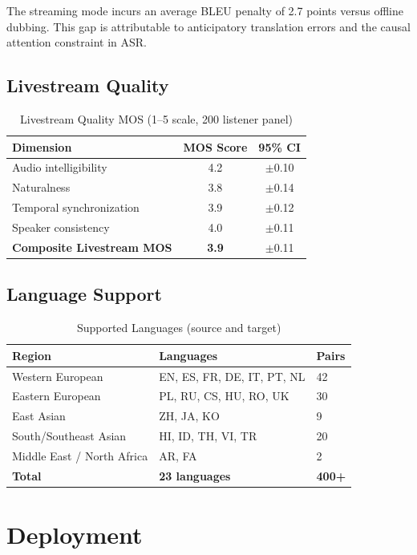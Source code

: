 \documentclass[11pt,a4paper]{article}
\begin{document}
The streaming mode incurs an average BLEU penalty of 2.7 points versus offline dubbing. This gap is attributable to anticipatory translation errors and the causal attention constraint in ASR.

\subsection{Livestream Quality}

\begin{table}[H]
\centering
\caption{Livestream Quality MOS (1--5 scale, 200 listener panel)}
\begin{tabular}{lcc}
\toprule
\textbf{Dimension} & \textbf{MOS Score} & \textbf{95\% CI} \\
\midrule
Audio intelligibility & 4.2 & $\pm$0.10 \\
Naturalness & 3.8 & $\pm$0.14 \\
Temporal synchronization & 3.9 & $\pm$0.12 \\
Speaker consistency & 4.0 & $\pm$0.11 \\
\textbf{Composite Livestream MOS} & \textbf{3.9} & $\pm$0.11 \\
\bottomrule
\end{tabular}
\end{table}

\subsection{Language Support}

\begin{table}[H]
\centering
\caption{Supported Languages (source and target)}
\begin{tabular}{lll}
\toprule
\textbf{Region} & \textbf{Languages} & \textbf{Pairs} \\
\midrule
Western European & EN, ES, FR, DE, IT, PT, NL & 42 \\
Eastern European & PL, RU, CS, HU, RO, UK & 30 \\
East Asian & ZH, JA, KO & 9 \\
South/Southeast Asian & HI, ID, TH, VI, TR & 20 \\
Middle East / North Africa & AR, FA & 2 \\
\midrule
\textbf{Total} & \textbf{23 languages} & \textbf{400+} \\
\bottomrule
\end{tabular}
\end{table}

\section{Deployment}
\end{document}
